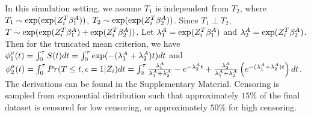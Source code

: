In this simulation setting, we assume $T_1$ is independent from $T_2$, 
where $T_1 \sim \exp(\exp(Z_i^T\beta_1^A))$, $T_2 \sim \exp(\exp(Z_i^T\beta_2^A))$. Since $T_1 \perp T_2$, $T \sim \exp(\exp(Z_i^T\beta_1^A) + \exp(Z_i^T\beta_2^A))$.
Let $\lambda^A_1 = \exp(Z_i^T\beta_1^A)$ and $\lambda^A_2 = \exp(Z_i^T\beta_2^A)$. Then for the truncated mean criterion, we have $
\label{eqn:sims_crit_simpleexp}
\phi_1^\mu(t) = \int_0^\tau S(t)dt = \int_0^\tau \exp(-(\lambda^A_1+\lambda^A_2)t)dt$ and $
\phi_2^\mu(t) = \int_0^\tau Pr(T \leq t, \epsilon = 1|Z_i) dt = \int_0^\tau \frac{\lambda^A_1}{\lambda^A_1 + \lambda^A_2} - e^{-\lambda^A_2 t} + \frac{\lambda^A_2}{\lambda^A_1 + \lambda^A_2}\left(e^{-(\lambda^A_1 +\lambda^A_2) t} \right) dt
$. The derivations can be found in the Supplementary Material. Censoring is sampled from exponential distribution such that approximately $15\%$ of the final dataset is censored for low censoring, or approximately $50\%$ for high censoring. 


